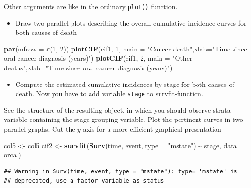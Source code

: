 \documentclass[
]{book}
\newenvironment{Shaded}{\begin{snugshade}}{\end{snugshade}}
\newcommand{\AttributeTok}[1]{\textcolor[rgb]{0.13,0.29,0.53}{#1}}
\newcommand{\DecValTok}[1]{\textcolor[rgb]{0.00,0.00,0.81}{#1}}
\newcommand{\FunctionTok}[1]{\textcolor[rgb]{0.13,0.29,0.53}{\textbf{#1}}}
\newcommand{\NormalTok}[1]{#1}
\newcommand{\OtherTok}[1]{\textcolor[rgb]{0.56,0.35,0.01}{#1}}
\newcommand{\SpecialCharTok}[1]{\textcolor[rgb]{0.81,0.36,0.00}{\textbf{#1}}}
\newcommand{\StringTok}[1]{\textcolor[rgb]{0.31,0.60,0.02}{#1}}
\providecommand{\tightlist}{%
  \setlength{\itemsep}{0pt}\setlength{\parskip}{0pt}}
\begin{document}
Other arguments are like in the ordinary \texttt{plot()} function.

\begin{itemize}
\tightlist
\item
  Draw two parallel plots describing the overall cumulative incidence
  curves for both causes of death
\end{itemize}

\begin{Shaded}
\begin{Highlighting}[]
\FunctionTok{par}\NormalTok{(}\AttributeTok{mfrow =} \FunctionTok{c}\NormalTok{(}\DecValTok{1}\NormalTok{, }\DecValTok{2}\NormalTok{))}
\FunctionTok{plotCIF}\NormalTok{(cif1, }\DecValTok{1}\NormalTok{, }\AttributeTok{main =} \StringTok{"Cancer death"}\NormalTok{,}\AttributeTok{xlab=}\StringTok{"Time since oral cancer diagnosis (years)"}\NormalTok{)}
\FunctionTok{plotCIF}\NormalTok{(cif1, }\DecValTok{2}\NormalTok{, }\AttributeTok{main =} \StringTok{"Other deaths"}\NormalTok{,}\AttributeTok{xlab=}\StringTok{"Time since oral cancer diagnosis (years)"}\NormalTok{)}
\end{Highlighting}
\end{Shaded}

\begin{itemize}
\tightlist
\item
  Compute the estimated cumulative incidences by stage for both causes
  of death. Now you have to add variable \texttt{stage} to survfit-function.
\end{itemize}

See the structure of the resulting object, in which you should observe
strata variable containing the stage grouping variable. Plot the
pertinent curves in two parallel graphs. Cut the \(y\)-axis for a more
efficient graphical presentation

\begin{Shaded}
\begin{Highlighting}[]
\NormalTok{col5 }\OtherTok{\textless{}{-}}\NormalTok{ col5}
\NormalTok{cif2 }\OtherTok{\textless{}{-}} \FunctionTok{survfit}\NormalTok{(}\FunctionTok{Surv}\NormalTok{(time, event, }\AttributeTok{type =} \StringTok{"mstate"}\NormalTok{) }\SpecialCharTok{\textasciitilde{}}\NormalTok{ stage,}
  \AttributeTok{data =}\NormalTok{ orca}
\NormalTok{)}
\end{Highlighting}
\end{Shaded}

\begin{verbatim}
## Warning in Surv(time, event, type = "mstate"): type= 'mstate' is
## deprecated, use a factor variable as status
\end{verbatim}
\end{document}
